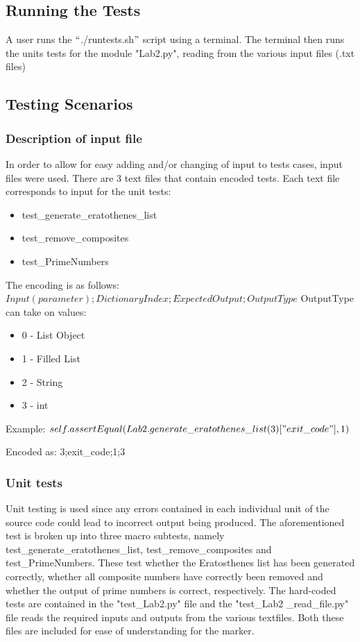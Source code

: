 \documentclass[]{article}
\begin{document}
\subsection{Running the Tests}
A user runs the $``$./runtests.sh$"$  script using a terminal. The terminal then runs the units tests for the module "Lab2.py", reading from the various input files (.txt files)

\subsection{Testing Scenarios}

\subsubsection{Description of input file}
In order to allow for easy adding and/or changing of input to tests cases, input files were used.
\newline
There are 3 text files that contain encoded tests. Each text file corresponds to input for the unit tests: 
\begin{itemize}
  \item test\_generate\_eratothenes\_list \item test\_remove\_composites 
  \item test\_PrimeNumbers
\end{itemize}

The encoding is as follows:
$Input(parameter);DictionaryIndex;ExpectedOutput;OutputType$
\newline\newline
OutputType can take on values:
\begin{itemize}

    \item 0 - List Object
\item 1 - Filled List
\item 2 - String
\item 3 - int
\end{itemize}
  



Example:
$self.assertEqual(Lab2.generate\_eratothenes\_list(3)["exit\_code"],1)$

Encoded as: 3;exit\_code;1;3

\subsubsection{Unit tests}

Unit testing is used since any errors contained in each individual unit of the source code could lead to incorrect output being produced. The aforementioned test is broken up into three macro subtests, namely test\_generate\_eratothenes\_list, test\_remove\_composites and test\_PrimeNumbers. These test whether the Eratosthenes list has been generated correctly, whether all composite numbers have correctly been removed and whether the output of prime numbers is correct, respectively. The hard-coded tests are contained in the "test\_Lab2.py" file and the "test\_Lab2
\_read\_file.py" file reads the required inputs and outputs from the various textfiles. Both these files are included for ease of understanding for the marker. 
\end{document}
